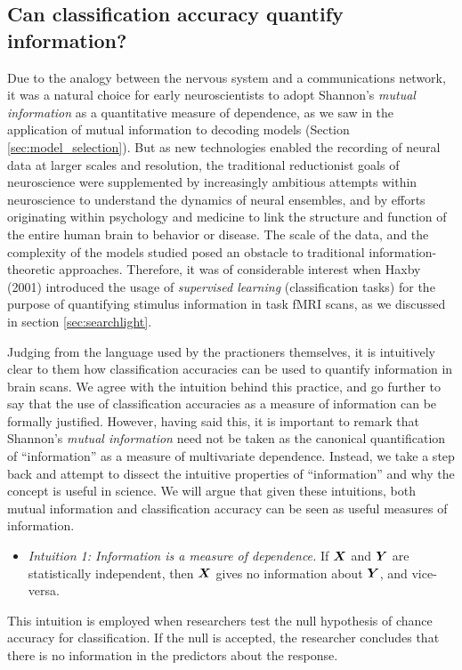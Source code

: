 \subsection{Can classification accuracy quantify information?}

Due to the analogy between the nervous system and a communications
network, it was a natural choice for early neuroscientists to adopt
Shannon's \emph{mutual information} as a quantitative measure of
dependence, as we saw in the application of mutual information to
decoding models (Section \ref{sec:model_selection}).  But as new
technologies enabled the recording of neural data at larger scales and
resolution, the traditional reductionist goals of neuroscience were
supplemented by increasingly ambitious attempts within neuroscience to
understand the dynamics of neural ensembles, and by efforts
originating within psychology and medicine to link the structure and
function of the entire human brain to behavior or disease.  The scale
of the data, and the complexity of the models studied posed an
obstacle to traditional information-theoretic approaches.  Therefore,
it was of considerable interest when Haxby (2001) introduced the usage
of \emph{supervised learning} (classification tasks) for the purpose
of quantifying stimulus information in task fMRI scans, as we
discussed in section \ref{sec:searchlight}.

Judging from the language used by the practioners themselves, it is
intuitively clear to them how classification accuracies can be used to
quantify information in brain scans.  We agree with the intuition
behind this practice, and go further to say that the use of
classification accuracies as a measure of information can be formally
justified.  However, having said this, it is important to remark that
Shannon's \emph{mutual information} need not be taken as the canonical
quantification of ``information'' as a measure of multivariate
dependence.  Instead, we take a step back and attempt to dissect the
intuitive properties of ``information'' and why the concept is useful
in science.  We will argue that given these intuitions, both mutual
information and classification accuracy can be seen as useful measures
of information.

\begin{itemize}
\item \emph{
Intuition 1: Information is a measure of dependence.}   If $\boldsymbol{X}$ and $\boldsymbol{Y}$ are statistically independent, then
$\boldsymbol{X}$ gives no information about $\boldsymbol{Y}$, and vice-versa.
\end{itemize}
This intuition is employed when researchers test the null hypothesis
of chance accuracy for classification.  If the null is accepted, the
researcher concludes that there is no information in the predictors
about the response.

